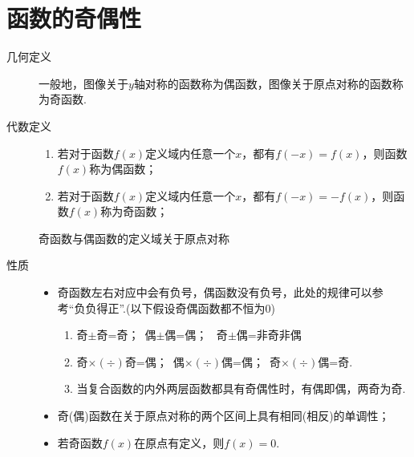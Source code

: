 \section{函数的奇偶性}
  \begin{description}
    \item[几何定义] 一般地，图像关于$y$轴对称的函数称为偶函数，图像关于原点对称的函数称为奇函数.
    \item[代数定义]
    \begin{enumerate}[label=\arabic*)]
      \item[] \hspace{-2em}若对于函数$f(x)$定义域内任意一个$x$，都有$f(-x)=f(x)$，则函数$f(x)$称为偶函数；
      \item[] 若对于函数$f(x)$定义域内任意一个$x$，都有$f(-x)=-f(x)$，则函数$f(x)$称为奇函数；
    \end{enumerate}
    {\kaishu
      奇函数与偶函数的定义域关于原点对称
    }
    \item[性质]
      \begin{itemize}
        \item
          奇函数左右对应中会有负号，偶函数没有负号，此处的规律可以参考“负负得正”.{\kaishu (以下假设奇偶函数都不恒为$ 0 $)}
          \begin{enumerate}[label=\circled{\arabic*}]
            \kaishu
            \item 奇$\pm$奇=奇；\  偶$\pm $偶=偶；
            \  奇$\pm$偶=非奇非偶
            \item 奇$\times(\div)$奇=偶；\ 偶$\times(\div)$偶=偶；\  奇$\times(\div)$偶=奇.
            \item 当复合函数的内外两层函数都具有奇偶性时，有偶即偶，两奇为奇.
          \end{enumerate}
        \item
          奇(偶)函数在关于原点对称的两个区间上具有相同(相反)的单调性；
        \item 若奇函数$f(x)$在原点有定义，则$f(x)=0$.
      \end{itemize}
  \end{description}
  \clearpage
